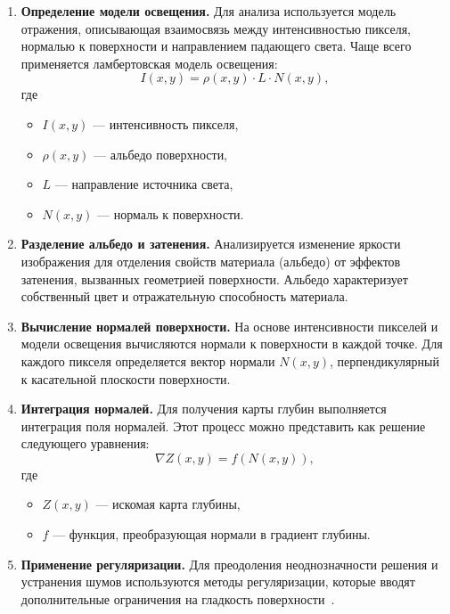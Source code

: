 \begin{enumerate}[label=\arabic*.]
\item \textbf{Определение модели освещения.}
Для анализа используется модель отражения, описывающая взаимосвязь между интенсивностью пикселя, нормалью к поверхности и направлением падающего света. Чаще всего применяется ламбертовская модель освещения:
\begin{equation}
I(x,y) = \rho(x,y) \cdot L \cdot N(x,y),
\end{equation}
где
\begin{itemize}
    \item $I(x,y)$ --- интенсивность пикселя,
    \item $\rho(x,y)$ --- альбедо поверхности,
    \item $L$ --- направление источника света,
    \item $N(x,y)$ --- нормаль к поверхности.
\end{itemize}

\item \textbf{Разделение альбедо и затенения.}
Анализируется изменение яркости изображения для отделения свойств материала (альбедо) от эффектов затенения, вызванных геометрией поверхности.
Альбедо характеризует собственный цвет и отражательную способность материала.

\item \textbf{Вычисление нормалей поверхности.}
На основе интенсивности пикселей и модели освещения вычисляются нормали к поверхности в каждой точке.
Для каждого пикселя определяется вектор нормали $N(x,y)$, перпендикулярный к касательной плоскости поверхности.

\item \textbf{Интеграция нормалей.}
Для получения карты глубин выполняется интеграция поля нормалей.
Этот процесс можно представить как решение следующего уравнения:
\begin{equation}
\nabla Z(x,y) = f(N(x,y)),
\end{equation}
где
\begin{itemize}
\item $Z(x,y)$ --- искомая карта глубины,
\item $f$ --- функция, преобразующая нормали в градиент глубины.
\end{itemize}

\item \textbf{Применение регуляризации.}
Для преодоления неоднозначности решения и устранения шумов используются методы регуляризации, которые вводят дополнительные ограничения на гладкость поверхности~\cite{stanowski2024stability}.
\end{enumerate}

